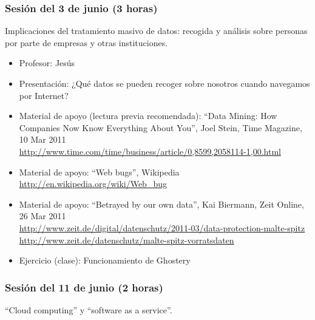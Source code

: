 \documentclass[a4paper,12pt]{article}
\begin{document}
\subsubsection{Sesión del 3 de junio (3 horas)}

Implicaciones del tratamiento masivo de datos: recogida y análisis sobre personas por parte de empresas y otras instituciones.

\begin{itemize}
\item Profesor: Jesús
\item Presentación: ¿Qué datos se pueden recoger sobre nosotros cuando navegamos por Internet?
\item Material de apoyo (lectura previa recomendada): ``Data Mining: How Companies Now Know Everything About You'', Joel Stein, Time Magazine, 10 Mar 2011 \\
  \url{http://www.time.com/time/business/article/0,8599,2058114-1,00.html}
\item Material de apoyo: ``Web bugs'', Wikipedia \\
  \url{http://en.wikipedia.org/wiki/Web_bug}
\item Material de apoyo: ``Betrayed by our own data'', Kai Biermann, Zeit Online, 26 Mar 2011 \\
  \url{http://www.zeit.de/digital/datenschutz/2011-03/data-protection-malte-spitz} \\
  \url{http://www.zeit.de/datenschutz/malte-spitz-vorratsdaten}
\item Ejercicio (clase): Funcionamiento de Ghostery
\end{itemize}

\subsubsection{Sesión del 11 de junio (2 horas)}

``Cloud computing'' y ``software as a service''.
\end{document}

